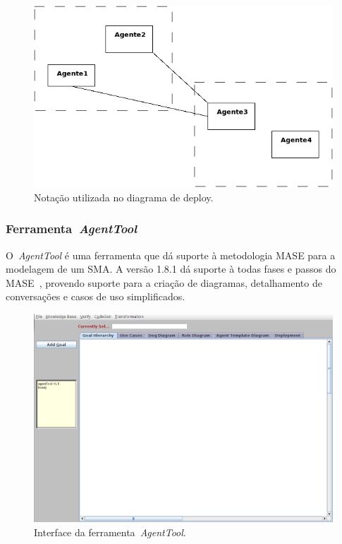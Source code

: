 \begin{figure}
	\centering
	\includegraphics[scale=0.65]{images/exemplo-diagrama-deploy.png}
	\caption{Notação utilizada no diagrama de deploy.}
	\label{fig:exemplo-diagrama-deploy}
\end{figure}

\subsubsection{Ferramenta~\emph{AgentTool}}

O~\emph{AgentTool} é uma ferramenta que dá suporte à metodologia MASE para a modelagem de um SMA. A versão 1.8.1 dá suporte à todas fases e passos do MASE~\cite{agentTool2012}, provendo suporte para a criação de diagramas, detalhamento de conversações e casos de uso simplificados.

\begin{figure}
	\centering
	\includegraphics[scale=0.4]{images/interface-agent-tool.png}
	\caption{Interface da ferramenta~\emph{AgentTool}.}
	\label{fig:interface-agent-tool}
\end{figure}

